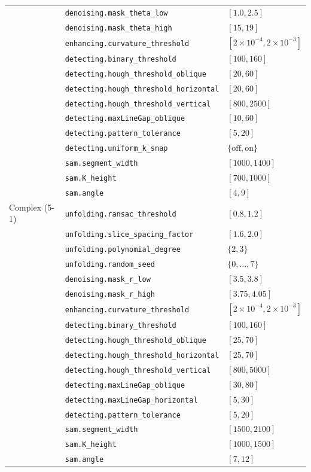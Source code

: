 \documentclass[a4paper,fleqn]{cas-dc}
\begin{document}
{\begin{table}[t]
{\begin{tabular*}{\textwidth}{@{\extracolsep{\fill}} llp{} @{}}
 & \texttt{denoising.mask\_theta\_low} & $[1.0,2.5]$ \\
 & \texttt{denoising.mask\_theta\_high} & $[15,19]$ \\
 & \texttt{enhancing.curvature\_threshold} & $[2{\times}10^{-4},2{\times}10^{-3}]$ \\
 & \texttt{detecting.binary\_threshold} & $[100,160]$ \\
 & \texttt{detecting.hough\_threshold\_oblique} & $[20,60]$ \\
 & \texttt{detecting.hough\_threshold\_horizontal} & $[20,60]$ \\
 & \texttt{detecting.hough\_threshold\_vertical} & $[800,2500]$ \\
 & \texttt{detecting.maxLineGap\_oblique} & $[10,60]$ \\
 & \texttt{detecting.pattern\_tolerance} & $[5,20]$ \\
 & \texttt{detecting.uniform\_k\_snap} & $\{\mathrm{off},\mathrm{on}\}$ \\
 & \texttt{sam.segment\_width} & $[1000,1400]$ \\
 & \texttt{sam.K\_height} & $[700,1000]$ \\
 & \texttt{sam.angle} & $[4,9]$ \\
\addlinespace
Complex (5-1) & \texttt{unfolding.ransac\_threshold} & $[0.8,1.2]$ \\
 & \texttt{unfolding.slice\_spacing\_factor} & $[1.6,2.0]$ \\
 & \texttt{unfolding.polynomial\_degree} & $\{2,3\}$ \\
 & \texttt{unfolding.random\_seed} & $\{0,\ldots,7\}$ \\
 & \texttt{denoising.mask\_r\_low} & $[3.5,3.8]$ \\
 & \texttt{denoising.mask\_r\_high} & $[3.75,4.05]$ \\
 & \texttt{enhancing.curvature\_threshold} & $[2{\times}10^{-4},2{\times}10^{-3}]$ \\
 & \texttt{detecting.binary\_threshold} & $[100,160]$ \\
 & \texttt{detecting.hough\_threshold\_oblique} & $[25,70]$ \\
 & \texttt{detecting.hough\_threshold\_horizontal} & $[25,70]$ \\
 & \texttt{detecting.hough\_threshold\_vertical} & $[800,5000]$ \\
 & \texttt{detecting.maxLineGap\_oblique} & $[30,80]$ \\
 & \texttt{detecting.maxLineGap\_horizontal} & $[5,30]$ \\
 & \texttt{detecting.pattern\_tolerance} & $[5,20]$ \\
 & \texttt{sam.segment\_width} & $[1500,2100]$ \\
 & \texttt{sam.K\_height} & $[1000,1500]$ \\
 & \texttt{sam.angle} & $[7,12]$ \\
\bottomrule
\end{tabular*}}
\end{table}


}
\end{document}
